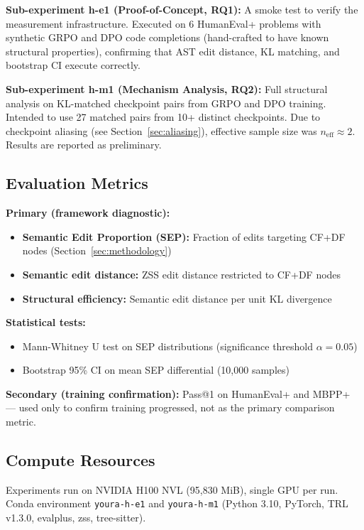 \textbf{Sub-experiment h-e1 (Proof-of-Concept, RQ1):} A smoke test to verify the
measurement infrastructure. Executed on 6 HumanEval+ problems with synthetic
GRPO and DPO code completions (hand-crafted to have known structural properties),
confirming that AST edit distance, KL matching, and bootstrap CI execute correctly.

\textbf{Sub-experiment h-m1 (Mechanism Analysis, RQ2):} Full structural analysis
on KL-matched checkpoint pairs from GRPO and DPO training. Intended to use
27 matched pairs from 10+ distinct checkpoints. Due to checkpoint aliasing
(see Section~\ref{sec:aliasing}), effective sample size was $n_\text{eff} \approx 2$.
Results are reported as preliminary.

\subsection{Evaluation Metrics}

\textbf{Primary (framework diagnostic):}
\begin{itemize}
  \item \textbf{Semantic Edit Proportion (SEP):} Fraction of edits targeting CF+DF nodes (Section~\ref{sec:methodology})
  \item \textbf{Semantic edit distance:} ZSS edit distance restricted to CF+DF nodes
  \item \textbf{Structural efficiency:} Semantic edit distance per unit KL divergence
\end{itemize}

\textbf{Statistical tests:}
\begin{itemize}
  \item Mann-Whitney U test on SEP distributions (significance threshold $\alpha = 0.05$)
  \item Bootstrap 95\% CI on mean SEP differential (10,000 samples)
\end{itemize}

\textbf{Secondary (training confirmation):}
Pass@1 on HumanEval+ and MBPP+ --- used only to confirm training progressed,
not as the primary comparison metric.

\subsection{Compute Resources}

Experiments run on NVIDIA H100 NVL (95,830 MiB), single GPU per run.
Conda environment \texttt{youra-h-e1} and \texttt{youra-h-m1} (Python 3.10, PyTorch,
TRL v1.3.0, evalplus, zss, tree-sitter).
